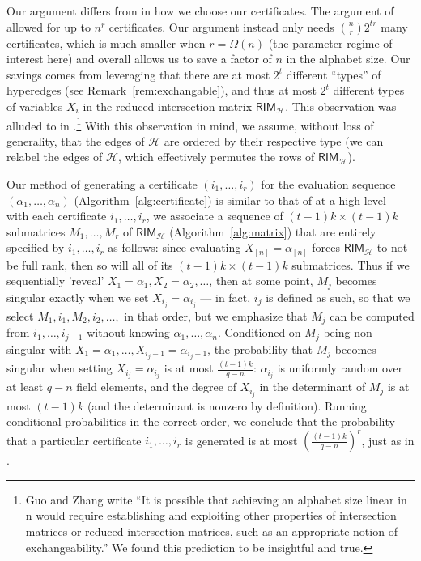 \documentclass{article}[11pt]
\begin{document}
Our argument differs from \cite{GZ23} in how we choose our certificates. The argument of \cite{GZ23} allowed for up to $n^r$ certificates. Our argument instead only needs $\binom{n}{r}2^{tr}$ many certificates, which is much smaller when $r=\Omega(n)$ (the parameter regime of interest here) and overall allows us to save a factor of $n$ in the alphabet size.
Our savings comes from leveraging that there are at most $2^t$ different ``types'' of hyperedges (see Remark~\ref{rem:exchangable}), and thus at most $2^t$ different types of variables $X_i$ in the reduced intersection matrix $\mathsf{RIM}_\mathcal{H}$.
This observation was alluded to in \cite{GZ23}.\footnote{Guo and Zhang \cite{GZ23} write ``It is possible that achieving an alphabet size linear in n would require establishing and exploiting other properties of intersection matrices or reduced intersection matrices, such as an appropriate notion of exchangeability.'' We found this prediction to be insightful and true.}
With this observation in mind, we assume, without loss of generality, that the edges of $\mathcal{H}$ are ordered by their respective type (we can relabel the edges of $\mathcal{H}$, which effectively permutes the rows of $\mathsf{RIM}_\mathcal{H}$).

Our method of generating a certificate $(i_1,\dots,i_r)$ for the evaluation sequence $(\alpha_1,\dots,\alpha_n)$ (Algorithm~\ref{alg:certificate}) is similar to that of \cite{GZ23} at a high level---with each certificate $i_1,\dots,i_r$, we associate a sequence of $(t-1)k \times (t-1)k$ submatrices $M_1,\dots,M_r$ of $\mathsf{RIM}_\mathcal{H}$ (Algorithm~\ref{alg:matrix}) that are entirely specified by $i_1,\dots,i_r$ as follows: since evaluating $X_{[n]} = \alpha_{[n]}$ forces $\mathsf{RIM}_\mathcal{H}$ to not be full rank, then so will all of its $(t-1)k \times (t-1)k$ submatrices. Thus if we sequentially 'reveal' $X_1=\alpha_1, X_2=\alpha_2,\dots$, then at some point, $M_j$ becomes singular exactly when we set $X_{i_j}=\alpha_{i_j}$ --- in fact, $i_j$ is defined as such, so that we select $M_1,i_1,M_2,i_2,\dots,$ in that order, but we emphasize that $M_j$ can be computed from $i_1,\dots,i_{j-1}$ without knowing $\alpha_1,\dots,\alpha_n$.
Conditioned on $M_j$ being non-singular with $X_1=\alpha_1,\dots,X_{i_j-1}=\alpha_{i_j-1}$, the probability that $M_j$ becomes singular when setting $X_{i_j}=\alpha_{i_j}$ is at most $\frac{(t-1)k}{q-n}$: $\alpha_{i_j}$ is uniformly random over at least $q-n$ field elements, and the degree of $X_{i_j}$ in the determinant of $M_j$ is at most $(t-1)k$ (and the determinant is nonzero by definition).
Running conditional probabilities in the correct order, we conclude that the probability that a particular certificate $i_1,\dots,i_r$ is generated is at most $(\frac{(t-1)k}{q-n})^r$, just as in \cite{GZ23}.
\end{document}
